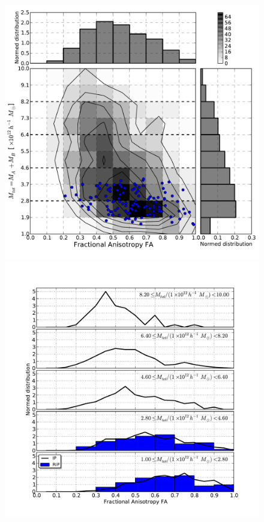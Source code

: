 \documentclass[usenatbib]{latex/mn2e}
\begin{document}
\begin{flushleft}
\begin{figure}
\begin{center}

  \includegraphics[trim = 3mm 9mm 3mm 4mm, clip, keepaspectratio=true,
  width=0.36\textheight]{./figures/totalmass_FA_BDM_Tweb}
  \includegraphics[trim = 5mm 9mm 17mm 15mm, clip, keepaspectratio=true,
  width=0.36\textheight]{./figures/single_totalmass_FA_BDM_Tweb}
  

\end{center}
\end{figure}
\end{flushleft}
\end{document}
